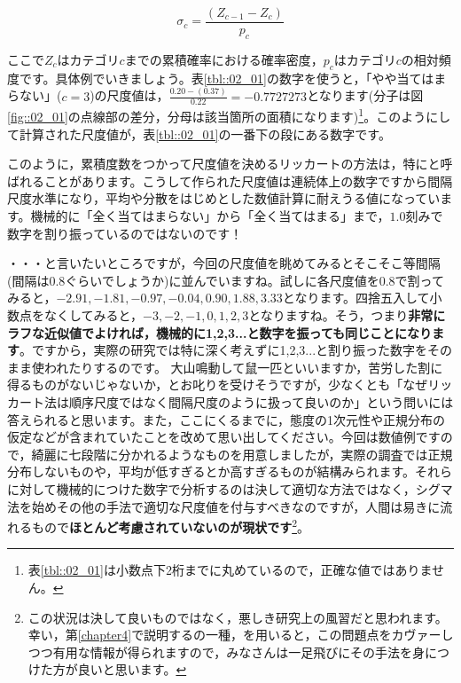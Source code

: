 \documentclass{ltjsbook}
\begin{document}
\[ \sigma_c = \frac{(Z_{c-1} - Z_{c})}{p_c} \]

ここで$Z_c$はカテゴリ$c$までの累積確率における確率密度，$p_c$はカテゴリ$c$の相対頻度です。具体例でいきましょう。表\ref{tbl::02_01}の数字を使うと，「やや当てはまらない」($c=3$)の尺度値は，$\frac{0.20-(0.37)}{0.22}=-0.7727273$となります(分子は図\ref{fig::02_01}の点線部の差分，分母は該当箇所の面積になります)\footnote{表\ref{tbl::02_01}は小数点下2桁までに丸めているので，正確な値ではありません。}。このようにして計算された尺度値が，表\ref{tbl::02_01}の一番下の段にある数字です。

このように，累積度数をつかって尺度値を決めるリッカートの方法は，特にと呼ばれることがあります。こうして作られた尺度値は連続体上の数字ですから間隔尺度水準になり，平均や分散をはじめとした数値計算に耐えうる値になっています。機械的に「全く当てはまらない」から「全く当てはまる」まで，$1.0$刻みで数字を割り振っているのではないのです！


・・・と言いたいところですが，今回の尺度値を眺めてみるとそこそこ等間隔(間隔は$0.8$ぐらいでしょうか)に並んでいますね。試しに各尺度値を0.8で割ってみると，$-2.91,-1.81,-0.97, -0.04,0.90, 1.88, 3.33$となります。四捨五入して小数点をなくしてみると，$-3,-2,-1,0,1,2,3$となりますね。そう，つまり\textbf{非常にラフな近似値でよければ，機械的に1,2,3...と数字を振っても同じことになります}。ですから，実際の研究では特に深く考えずに1,2,3...と割り振った数字をそのまま使われたりするのです。
大山鳴動して鼠一匹といいますか，苦労した割に得るものがないじゃないか，とお叱りを受けそうですが，少なくとも「なぜリッカート法は順序尺度ではなく間隔尺度のように扱って良いのか」という問いには答えられると思います。また，ここにくるまでに，態度の1次元性や正規分布の仮定などが含まれていたことを改めて思い出してください。今回は数値例ですので，綺麗に七段階に分かれるようなものを用意しましたが，実際の調査では正規分布しないものや，平均が低すぎるとか高すぎるものが結構みられます。それらに対して機械的につけた数字で分析するのは決して適切な方法ではなく，シグマ法を始めその他の手法で適切な尺度値を付与すべきなのですが，人間は易きに流れるもので\textbf{ほとんど考慮されていないのが現状です}\footnote{この状況は決して良いものではなく，悪しき研究上の風習だと思われます。幸い，第\ref{chapter4}で説明するの一種，を用いると，この問題点をカヴァーしつつ有用な情報が得られますので，みなさんは一足飛びにその手法を身につけた方が良いと思います。}。
\end{document}
